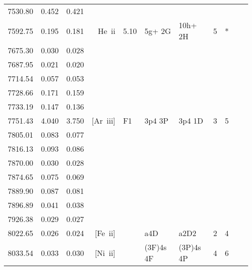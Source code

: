 \begin{longtable}{lrlrlllllll}
 7530.80 &   0.452 &   0.421                                                                                      \\
 7592.75 &   0.195 &   0.181 &  He~{\sc ii}     &  5.10      &  5g+ 2G    &  10h+ 2H   &          5 &        *    \\
 7675.30 &   0.030 &   0.028                                                                                      \\
 7687.95 &   0.021 &   0.020                                                                                      \\
 7714.54 &   0.057 &   0.053                                                                                      \\
 7728.66 &   0.171 &   0.159                                                                                      \\
 7733.19 &   0.147 &   0.136                                                                                      \\
 7751.43 &   4.040 &   3.750 &  [Ar~{\sc iii}]  &  F1        &  3p4 3P    &  3p4 1D    &          3 &        5    \\
 7805.01 &   0.083 &   0.077                                                                                      \\
 7816.13 &   0.093 &   0.086                                                                                      \\
 7870.00 &   0.030 &   0.028                                                                                      \\
 7874.65 &   0.075 &   0.069                                                                                      \\
 7889.90 &   0.087 &   0.081                                                                                      \\
 7896.89 &   0.041 &   0.038                                                                                      \\
 7926.38 &   0.029 &   0.027                                                                                      \\
 8022.65 &   0.026 &   0.024 & [Fe~{\sc ii}]    &            & a4D        & a2D2       &          2 &        4    \\
 8033.54 &   0.033 &   0.030 & [Ni~{\sc ii}]    &            & (3F)4s 4F  & (3P)4s 4P  &          4 &        6    \\

\end{longtable}
